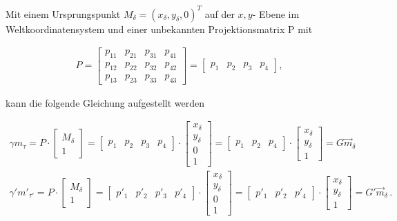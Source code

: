 Mit einem Ursprungspunkt $M_\delta=(x_\delta,y_\delta,0)^T$ auf der $x,y$- Ebene im Weltkoordinatensystem und einer unbekannten Projektionsmatrix P mit

\begin{gather}
	P=
	\begin{bmatrix}
		p_{11}&p_{21}&p_{31}&p_{41}\\
		p_{12}&p_{22}&p_{32}&p_{42}\\
		p_{13}&p_{23}&p_{33}&p_{43}
	\end{bmatrix}=	\begin{bmatrix}
		p_1&p_2&p_3&p_4
	\end{bmatrix},
\end{gather} 

kann die folgende Gleichung aufgestellt werden \cite{Elements}


\begin{gather}
	\gamma m_\tau = P \cdot 
	\begin{bmatrix}
		M_\delta\\1
	\end{bmatrix} = 
	\begin{bmatrix}
		p_1&p_2&p_3&p_4
	\end{bmatrix} \cdot
	\begin{bmatrix}
		x_\delta\\y_\delta\\0\\1
	\end{bmatrix}=
	\begin{bmatrix}
		p_1&p_2&p_4
	\end{bmatrix} \cdot
	\begin{bmatrix}
		x_\delta\\y_\delta\\1
	\end{bmatrix}=
	G \vec{m}_\delta\\
	\gamma' m'_{\tau'} = P \cdot 
	\begin{bmatrix}
		M_\delta\\1
	\end{bmatrix} = 
	\begin{bmatrix}
		p'_1&p'_2&p'_3&p'_4
	\end{bmatrix} \cdot
	\begin{bmatrix}
		x_\delta\\y_\delta\\0\\1
	\end{bmatrix}=
	\begin{bmatrix}
		p'_1&p'_2&p'_4
	\end{bmatrix} \cdot
	\begin{bmatrix}
		x_\delta\\y_\delta\\1
	\end{bmatrix}=
	G' \vec{m}_{\delta} \, . 
\end{gather}\\



